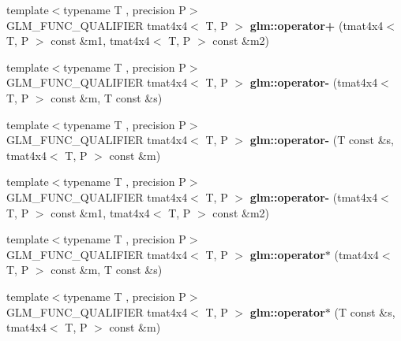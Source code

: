 \begin{DoxyCompactItemize}
{\footnotesize template$<$typename T , precision P$>$ }\\G\+L\+M\+\_\+\+F\+U\+N\+C\+\_\+\+Q\+U\+A\+L\+I\+F\+I\+ER tmat4x4$<$ T, P $>$ {\bfseries glm\+::operator+} (tmat4x4$<$ T, P $>$ const \&m1, tmat4x4$<$ T, P $>$ const \&m2)
\item 
\mbox{\label{type__mat4x4_8inl_a663ddfcf136f3a13694686bb0697bbde}} 
{\footnotesize template$<$typename T , precision P$>$ }\\G\+L\+M\+\_\+\+F\+U\+N\+C\+\_\+\+Q\+U\+A\+L\+I\+F\+I\+ER tmat4x4$<$ T, P $>$ {\bfseries glm\+::operator-\/} (tmat4x4$<$ T, P $>$ const \&m, T const \&s)
\item 
\mbox{\label{type__mat4x4_8inl_a24aba4a4b8f93adbdc8e6d301d713141}} 
{\footnotesize template$<$typename T , precision P$>$ }\\G\+L\+M\+\_\+\+F\+U\+N\+C\+\_\+\+Q\+U\+A\+L\+I\+F\+I\+ER tmat4x4$<$ T, P $>$ {\bfseries glm\+::operator-\/} (T const \&s, tmat4x4$<$ T, P $>$ const \&m)
\item 
\mbox{\label{type__mat4x4_8inl_a0533c5ac15cb344bc9a67803717c5300}} 
{\footnotesize template$<$typename T , precision P$>$ }\\G\+L\+M\+\_\+\+F\+U\+N\+C\+\_\+\+Q\+U\+A\+L\+I\+F\+I\+ER tmat4x4$<$ T, P $>$ {\bfseries glm\+::operator-\/} (tmat4x4$<$ T, P $>$ const \&m1, tmat4x4$<$ T, P $>$ const \&m2)
\item 
\mbox{\label{type__mat4x4_8inl_a60a8cd46716e5c76a3011578444ffef7}} 
{\footnotesize template$<$typename T , precision P$>$ }\\G\+L\+M\+\_\+\+F\+U\+N\+C\+\_\+\+Q\+U\+A\+L\+I\+F\+I\+ER tmat4x4$<$ T, P $>$ {\bfseries glm\+::operator$\ast$} (tmat4x4$<$ T, P $>$ const \&m, T const \&s)
\item 
\mbox{\label{type__mat4x4_8inl_a227858cfdb144f8e65ba256f4f1797a8}} 
{\footnotesize template$<$typename T , precision P$>$ }\\G\+L\+M\+\_\+\+F\+U\+N\+C\+\_\+\+Q\+U\+A\+L\+I\+F\+I\+ER tmat4x4$<$ T, P $>$ {\bfseries glm\+::operator$\ast$} (T const \&s, tmat4x4$<$ T, P $>$ const \&m)
\item 
\mbox{\label{type__mat4x4_8inl_adbbcb07514e6d44aad7e6f40e80e8c99}} 

\end{DoxyCompactItemize}

